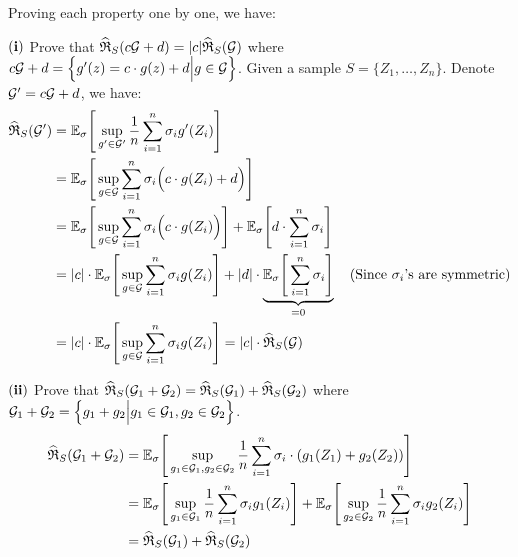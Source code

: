 \begin{solution*}
    Proving each property one by one, we have:
    \newline
    \begin{subproof}{${\bf (i)}$ Prove that $\widehat{\mathfrak{R}}_S(c\mathcal{G} + d) = |c|\widehat{\mathfrak{R}}_S(\mathcal{G})$ \newline where $c\mathcal{G}+d=\Big\{ g'(z) = c\cdot g(z) + d \Big| g\in\mathcal{G} \Big\}$.}
        Given a sample $S=\{Z_1, \dots, Z_n\}$. Denote $\mathcal{G}' = c\mathcal{G} + d$, we have:
        \begin{align*}
            \ERC_S(\G') 
                &= \E_\sigma\biggSquare{
                    \sup_{g'\in\G'} \frac{1}{n} \sum_{i=1}^n \sigma_i g'(Z_i)
                } \\
                &= \E_\sigma\biggSquare{
                    \sup_{g\in\G}\sum_{i=1}^n \sigma_i\bigRound{c\cdot g(Z_i) + d}
                } \\
                &= \E_\sigma\biggSquare{
                    \sup_{g\in\G}\sum_{i=1}^n \sigma_i \bigRound{c\cdot g(Z_i)}
                } + \E_\sigma\biggSquare{d\cdot\sum_{i=1}^n \sigma_i} \\
                &= |c|\cdot \E_\sigma\biggSquare{
                    \sup_{g\in\G}\sum_{i=1}^n \sigma_i g(Z_i)
                } + |d|\cdot\underbrace{\E_\sigma\biggSquare{\sum_{i=1}^n \sigma_i}}_{=0} \ \ \ \text{(Since $\sigma_i$'s are symmetric)} \\
                &= |c|\cdot \E_\sigma\biggSquare{
                    \sup_{g\in\G}\sum_{i=1}^n \sigma_i g(Z_i)
                } = |c|\cdot \ERC_S(\G)
        \end{align*}
    \end{subproof}

    \begin{subproof}{\newline ${\bf (ii)}$ Prove that $\widehat{\mathfrak{R}}_S(\mathcal{G}_1 + \mathcal{G}_2)=\widehat{\mathfrak{R}}_S(\mathcal{G}_1) + \widehat{\mathfrak{R}}_S(\mathcal{G}_2)$ \newline where $\mathcal{G}_1 + \mathcal{G}_2 = \Big\{ g_1 + g_2 \Big| g_1\in\mathcal{G}_1, g_2\in\mathcal{G}_2 \Big\}$.}
        \begin{align*}
            \widehat{\mathfrak{R}}_S(\mathcal{G}_1 + \mathcal{G}_2)
                &= \mathbb{E}_\sigma\Bigg[ 
                    \sup_{g_1\in\mathcal{G}_1, g_2\in\mathcal{G}_2} \frac{1}{n} \sum_{i=1}^n \sigma_i \cdot (g_1(Z_1) + g_2(Z_2))
                 \Bigg] \\
                &= \mathbb{E}_\sigma\Bigg[ 
                    \sup_{g_1\in\mathcal{G}_1}\frac{1}{n} \sum_{i=1}^n \sigma_i g_1(Z_i)
                 \Bigg] + \mathbb{E}_\sigma\Bigg[ 
                    \sup_{g_2\in\mathcal{G}_2}\frac{1}{n} \sum_{i=1}^n \sigma_i g_2(Z_i)
                 \Bigg] \\
                &= \widehat{\mathfrak{R}}_S(\mathcal{G}_1) + \widehat{\mathfrak{R}}_S(\mathcal{G}_2)
        \end{align*}
    \end{subproof}


\end{solution*}
